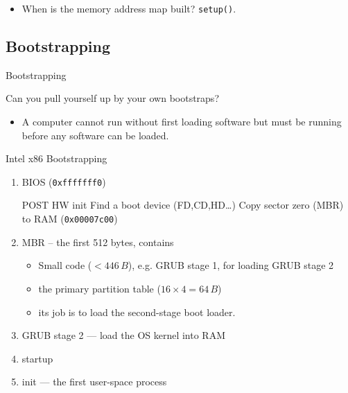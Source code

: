 \begin{itemize}
\item When is the memory address map built? \texttt{setup()}.
\end{itemize}

\subsection{Bootstrapping}
\label{sec:bootstrapping}

\begin{frame}{Bootstrapping}
  \begin{block}{Can you pull yourself up by your own bootstraps?}
    \begin{itemize}
    \item[] A computer cannot run without first loading software but must be running
      before any software can be loaded.
    \end{itemize}
  \end{block}
  \begin{center}
  \end{center}
\end{frame}

\begin{frame}{Intel x86 Bootstrapping}
  \begin{enumerate}
  \item BIOS (\texttt{0xfffffff0})\\
    \begin{small}
      {} POST\quad
      {} HW init\quad
      {} Find a boot device (FD,CD,HD\ldots{})\quad
      {} Copy \alert{sector zero (MBR)} to RAM (\texttt{0x00007c00})
    \end{small}
  \item MBR -- the first 512 bytes, contains
    \begin{itemize}
    \item Small code ($< 446\,B$), e.g. GRUB stage 1, for loading GRUB stage 2
    \item the primary partition table ($16\times{}4=64\,B$)
    \item its job is to load the second-stage boot loader.
    \end{itemize}
  \item GRUB stage 2 --- load the OS kernel into RAM
  \item {\linux} startup
  \item init --- the first user-space process
  \end{enumerate}
  \begin{center}
  \end{center}
  \qquad{}
\end{frame}

